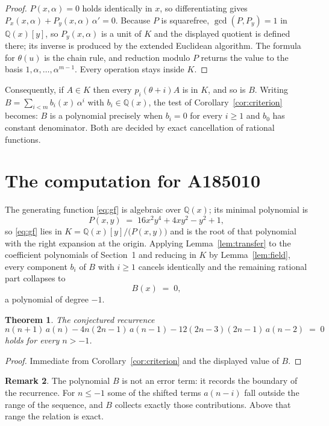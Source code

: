 \documentclass[11pt,a4paper]{article}
\theoremstyle{plain}
\newtheorem{theorem}{Theorem}
\theoremstyle{definition}
\newtheorem{remark}[theorem]{Remark}
\begin{document}
\begin{proof}
$P(x,\alpha)=0$ holds identically in $x$, so differentiating gives
$P_{x}(x,\alpha)+P_{y}(x,\alpha)\,\alpha'=0$. Because $P$ is squarefree,
$\gcd(P,P_{y})=1$ in $\mathbb{Q}(x)[y]$, so $P_{y}(x,\alpha)$ is a unit of $K$ and the
displayed quotient is defined there; its inverse is produced by the extended Euclidean
algorithm. The formula for $\theta(u)$ is the chain rule, and reduction modulo $P$ returns
the value to the basis $1,\alpha,\dots,\alpha^{m-1}$. Every operation stays inside $K$.
\end{proof}

Consequently, if $A\in K$ then every $p_{i}(\theta+i)A$ is in $K$, and so is $B$. Writing
$B=\sum_{i<m}b_{i}(x)\,\alpha^{i}$ with $b_{i}\in\mathbb{Q}(x)$, the test of
Corollary~\ref{cor:criterion} becomes: $B$ is a polynomial precisely when $b_{i}=0$ for
every $i\ge1$ and $b_{0}$ has constant denominator. Both are decided by exact
cancellation of rational functions.

\section{The computation for A185010}

The generating function \eqref{eq:gf} is algebraic over $\mathbb{Q}(x)$;
its minimal polynomial is
\[
P(x,y) \;=\; 16 x^{2} y^{4} + 4 x y^{2} - y^{2} + 1 ,
\]
so \eqref{eq:gf} lies in $K=\mathbb{Q}(x)[y]/\bigl(P(x,y)\bigr)$ and is the root of that polynomial with the right
expansion at the origin. Applying Lemma~\ref{lem:transfer} to the coefficient polynomials
of Section~1 and reducing in $K$ by Lemma~\ref{lem:field}, every component $b_{i}$ of $B$
with $i\ge1$ cancels identically and the remaining rational part collapses to
\[
B(x)\;=\;0 ,
\]
a polynomial of degree $-1$.

\begin{theorem}
The conjectured recurrence
\[
n \left(n + 1\right)\,a(n) -  4 n \left(2 n - 1\right)\,a(n-1) -  12 \left(2 n - 3\right) \left(2 n - 1\right)\,a(n-2) \;=\;0
\]
holds for every $n>-1$.
\end{theorem}

\begin{proof}
Immediate from Corollary~\ref{cor:criterion} and the displayed value of $B$.
\end{proof}

\begin{remark}
The polynomial $B$ is not an error term: it records the boundary of the recurrence. For
$n\le-1$ some of the shifted terms $a(n-i)$ fall outside the range of the sequence,
and $B$ collects exactly those contributions. Above that range the relation is exact.
\end{remark}
\end{document}
